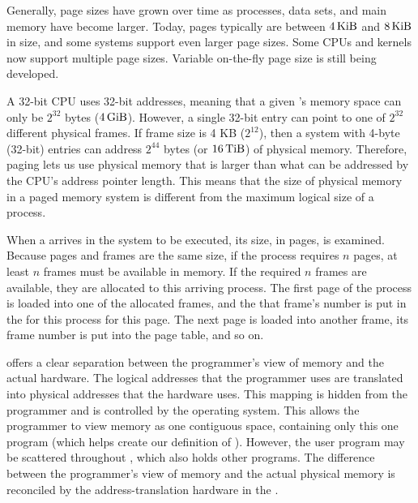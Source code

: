 Generally, page sizes have grown over time as processes, data sets, and main memory have become larger.
Today, pages typically are between $\SI{4}{\kibi{}\byte{}}$ and $\SI{8}{\kibi{}\byte{}}$ in size, and some systems support even larger page sizes.
Some CPUs and kernels now support multiple page sizes.
Variable on-the-fly page size is still being developed.

A 32-bit CPU uses 32-bit addresses, meaning that a given 's memory space can only be $2^{32}$ bytes ($\SI{4}{\gibi{}\byte{}}$).
However, a single 32-bit entry can point to one of $2^{32}$ different physical frames.
If frame size is 4 KB ($2^{12}$), then a system with 4-byte (32-bit) entries can address $2^{44}$ bytes (or $\SI{16}{\tebi{}\byte{}}$) of physical memory.
Therefore, paging lets us use physical memory that is larger than what can be addressed by the CPU’s address pointer length.
This means that the size of physical memory in a paged memory system is different from the maximum logical size of a process.

When a  arrives in the system to be executed, its size, in pages, is examined.
Because pages and frames are the same size, if the process requires $n$ pages, at least $n$ frames must be available in memory.
If the required $n$ frames are available, they are allocated to this arriving process.
The first page of the process is loaded into one of the allocated frames, and the that frame's number is put in the  for this process for this page.
The next page is loaded into another frame, its frame number is put into the page table, and so on.

 offers a clear separation between the programmer’s view of memory and the actual hardware.
The logical addresses that the programmer uses are translated into physical addresses that the hardware uses.
This mapping is hidden from the programmer and is controlled by the operating system.
This allows the programmer to view memory as one contiguous space, containing only this one program (which helps create our definition of ).
However, the user program may be scattered throughout , which also holds other programs.
The difference between the programmer’s view of memory and the actual physical memory is reconciled by the address-translation hardware in the .

